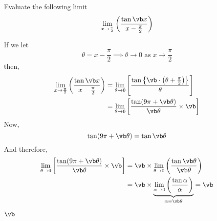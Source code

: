 

\MULTIPLY{}\vb

\question[4] Evaluate the following limit \[ \lim_{x\to\frac\pi{2}}\left(\dfrac{\tan\vb x}{x-\frac{\pi}{2}}\right)\]

\watchout

\begin{solution}[\halfpage]
  If we let 
  \[ \theta = x-\dfrac\pi{2} \implies \theta\to 0\text{ as }x\to\frac\pi{2} \]
  then,
  \begin{align}
    \lim_{x\to\frac\pi{2}}\left( \dfrac{\tan\vb x}{x-\frac\pi{2}}\right) &= 
    \lim_{\theta\to 0}\left[ 
    \dfrac{\tan\left\lbrace\vb\cdot\left( \theta + \frac\pi{2} \right)\right\rbrace}{\theta}
    \right] \\
    &= \lim_{\theta\to 0}\left[ \dfrac{\tan (\va\pi + \vb\theta)}{\vb\theta} \times\vb\right]
  \end{align}
  Now, 
  \[ \tan(\va\pi + \vb\theta) = \tan\vb\theta \]
  And therefore, 
  \begin{align}
    \lim_{\theta\to 0}\left[ \dfrac{\tan (\va\pi + \vb\theta)}{\vb\theta} \times\vb\right]
    &= \vb\times\lim_{\theta\to 0}\left( 
    \dfrac{\tan\vb\theta}{\vb\theta}\right) \\
    &= \vb\times\underbrace{\lim_{\alpha\to 0}\left( \dfrac{\tan\alpha}{\alpha}\right)}_{\alpha=\vb\theta} = \vb
  \end{align}

\end{solution}
\ifprintanswers\begin{codex}$\vb$\end{codex}\fi
